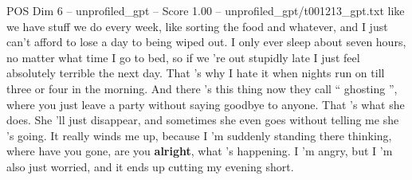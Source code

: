\begin{textsample}{POS Dim 6 – unprofiled\_gpt – Score 1.00 – unprofiled\_gpt/t001213\_gpt.txt}  \label{ex:f6_pos_025}
like we have stuff we do every week, like sorting the food and whatever, and I just can't afford to lose a day to being wiped out.
I only ever sleep about seven hours, no matter what time I go to bed, so if we ’re out stupidly late I just feel absolutely terrible the next day.
That ’s why I hate it when nights run on till three or four in the morning.
And there ’s this thing now they call “ ghosting ”, where you just leave a party without saying goodbye to anyone.
That ’s what she does.
She ’ll just disappear, and sometimes she even goes without telling me she ’s going.
It really winds me up, because I ’m suddenly standing there thinking, where have you gone, are you \textbf{alright}, what ’s happening.
I ’m angry, but I ’m also just worried, and it ends up cutting my evening short.

\end{textsample}
